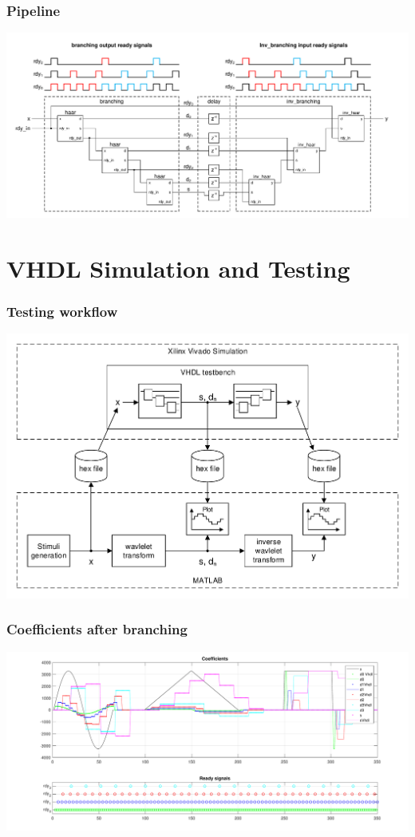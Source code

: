 \documentclass[english, aspectratio=169]{beamer}
\begin{document}
\begin{frame}

\frametitle{Pipeline}

	\centering
	\includegraphics[scale=0.45]{main_delay.pdf}

\end{frame}





\section{VHDL Simulation and Testing}
\begin{frame}
\frametitle{Testing workflow}
	\centering
	\includegraphics[scale=0.6]{vhdl_sim.pdf}
	
\end{frame}

\begin{frame}
\frametitle{Coefficients after branching}
	\centering
	\includegraphics[scale=0.42]{coefs.pdf}
\end{frame}
\end{document}
